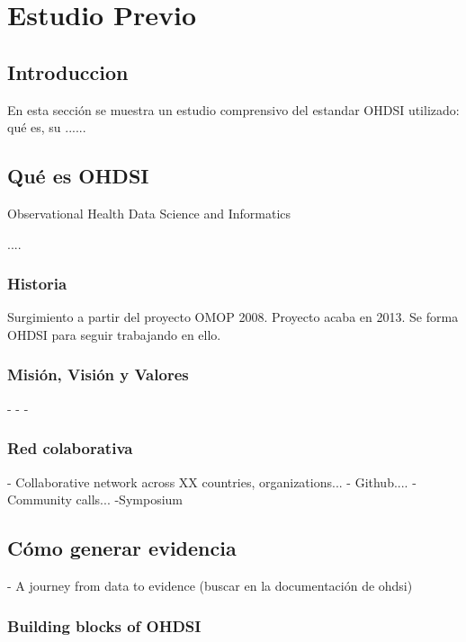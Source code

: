 \chapter{Estudio Previo}\label{cap:estudio}

\section{Introduccion}

En esta sección se muestra un estudio comprensivo del estandar OHDSI utilizado: qué es, su ......

\section{Qué es OHDSI}

Observational Health Data Science and Informatics

....

\subsection{Historia}

Surgimiento a partir del proyecto OMOP 2008. Proyecto acaba en 2013. Se forma OHDSI para seguir trabajando en ello.

\subsection{Misión, Visión y Valores}

-
-
-

\subsection{Red colaborativa}

- Collaborative network across XX countries, organizations...
- Github....
- Community calls...
-Symposium

\section{Cómo generar evidencia}

- A journey from data to evidence (buscar en la documentación de ohdsi)

\subsection{Building blocks of OHDSI}

